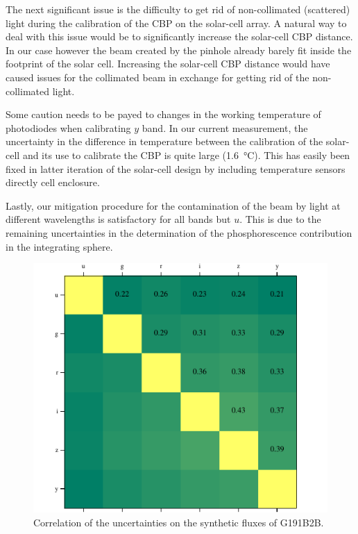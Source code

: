 The next significant issue is the difficulty to get rid of
non-collimated (scattered) light during the calibration of the CBP on
the solar-cell array. A natural way to deal with this issue would be
to significantly increase the solar-cell CBP distance. In our case
however the beam created by the \bpinhole pinhole already barely fit
inside the footprint of the solar cell. Increasing the solar-cell CBP
distance would have caused issues for the collimated beam in exchange
for getting rid of the non-collimated light.

Some caution needs to be payed to changes in the working temperature
of photodiodes when calibrating $y$ band. In our current measurement,
the uncertainty in the difference in temperature between the
calibration of the solar-cell and its use to calibrate the CBP is
quite large (\SI{1.6}{\celsius}). This has easily been fixed in latter
iteration of the solar-cell design by including temperature sensors
directly cell enclosure.

Lastly, our mitigation procedure for the contamination of the beam by
light at different wavelengths is satisfactory for all bands but
$u$. This is due to the remaining uncertainties in the determination
of the phosphorescence contribution in the integrating sphere.

\begin{figure}
  \centering
  \includegraphics[width=1\linewidth]{fig/bandcorrelation.pdf}
  \caption{Correlation of the uncertainties on the synthetic fluxes of G191B2B.}
  \label{fig:correlation}
\end{figure}

